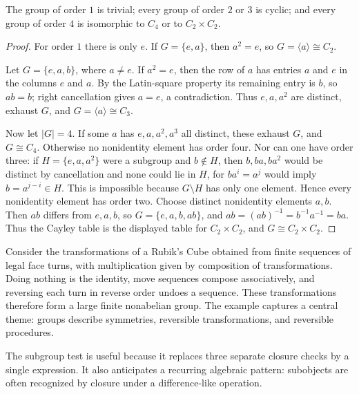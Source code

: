 \begin{proposition}
The group of order \(1\) is trivial; every group of order \(2\) or \(3\) is
cyclic; and every group of order \(4\) is isomorphic to \(C_4\) or to
\(C_2\times C_2\).
\end{proposition}
\begin{proof}
For order \(1\) there is only \(e\). If \(G=\{e,a\}\), then \(a^2=e\),
so \(G=\langle a\rangle\cong C_2\).

Let \(G=\{e,a,b\}\), where \(a\ne e\). If \(a^2=e\), then the row of
\(a\) has entries \(a\) and \(e\) in the columns \(e\) and \(a\). By the
Latin-square property its remaining entry is \(b\), so \(ab=b\); right
cancellation gives \(a=e\), a contradiction. Thus \(e,a,a^2\) are distinct,
exhaust \(G\), and \(G=\langle a\rangle\cong C_3\).

Now let \(|G|=4\). If some \(a\) has \(e,a,a^2,a^3\) all distinct, these
exhaust \(G\), and \(G\cong C_4\). Otherwise no nonidentity element has
order four. Nor can one have order three: if
\(H=\{e,a,a^2\}\) were a subgroup and \(b\notin H\), then \(b,ba,ba^2\)
would be distinct by cancellation and none could lie in \(H\), for
\(ba^i=a^j\) would imply \(b=a^{j-i}\in H\). This is impossible because
\(G\setminus H\) has only one element. Hence every nonidentity element has
order two. Choose distinct nonidentity elements \(a,b\). Then \(ab\) differs
from \(e,a,b\), so \(G=\{e,a,b,ab\}\), and
\(ab=(ab)^{-1}=b^{-1}a^{-1}=ba\). Thus the Cayley table is the displayed
table for \(C_2\times C_2\), and \(G\cong C_2\times C_2\).
\end{proof}

\begin{example}
Consider the transformations of a Rubik's Cube obtained from finite sequences
of legal face turns, with multiplication given by composition of transformations. Doing nothing is
the identity, move sequences compose associatively, and reversing each turn
in reverse order undoes a sequence. These transformations therefore form a
large finite nonabelian group. The example captures a central theme: groups
describe symmetries, reversible transformations, and reversible procedures.
\end{example}

The subgroup test is useful because it replaces three separate closure checks
by a single expression.  It also anticipates a recurring algebraic pattern:
subobjects are often recognized by closure under a difference-like operation.

